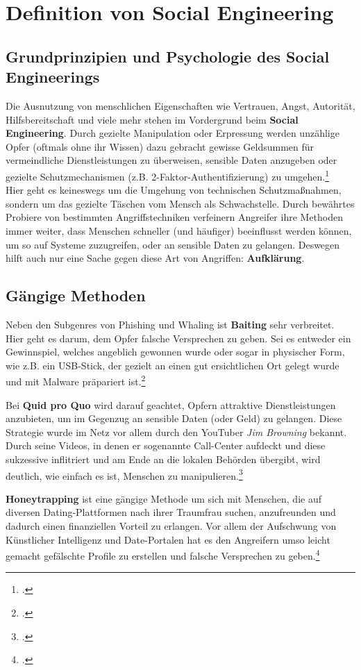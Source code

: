 \documentclass[12pt, a4paper, oneside]{scrartcl}
\begin{document}
\section{Definition von Social Engineering}

\subsection{Grundprinzipien und Psychologie des Social Engineerings}
Die Ausnutzung von menschlichen Eigenschaften wie Vertrauen, Angst, Autorität, Hilfsbereitschaft 
und viele mehr stehen im Vordergrund beim \textbf{Social Engineering}. Durch gezielte Manipulation
oder Erpressung werden unzählige Opfer (oftmals ohne ihr Wissen) dazu gebracht gewisse Geldsummen
für vermeindliche Dienstleistungen zu überweisen, sensible Daten anzugeben oder gezielte Schutzmechanismen
(z.B. 2-Faktor-Authentifizierung) zu umgehen.\footcite{BSISocialEngineering}\\
Hier geht es keineswegs um die Umgehung von technischen Schutzmaßnahmen, sondern um das gezielte
Täschen vom Mensch als Schwachstelle. Durch bewährtes Probiere von bestimmten Angriffstechniken
verfeinern Angreifer ihre Methoden immer weiter, dass Menschen schneller (und häufiger) beeinflusst
werden können, um so auf Systeme zuzugreifen, oder an sensible Daten zu gelangen.
Deswegen hilft auch nur eine Sache gegen diese Art von Angriffen: \textbf{Aufklärung}.\\

\subsection{Gängige Methoden}
Neben den Subgenres von Phishing und Whaling ist \textbf{Baiting} sehr verbreitet.
Hier geht es darum, dem Opfer falsche Versprechen zu geben. Sei es entweder ein Gewinnspiel,
welches angeblich gewonnen wurde oder sogar in physischer Form, wie z.B. ein USB-Stick,
der gezielt an einen gut ersichtlichen Ort gelegt wurde und mit Malware präpariert ist.\footcite{CS_10Arten}
\par
Bei \textbf{Quid pro Quo} wird darauf geachtet, Opfern attraktive Dienstleistungen anzubieten, um im Gegenzug
an sensible Daten (oder Geld) zu gelangen. Diese Strategie wurde im Netz vor allem durch den YouTuber \textit{Jim Browning} bekannt.
Durch seine Videos, in denen er sogenannte Call-Center aufdeckt und diese sukzessive inflitriert und
am Ende an die lokalen Behörden übergibt, wird deutlich, wie einfach es ist, Menschen zu manipulieren.\footcite{JB_YouTube}
\par
\textbf{Honeytrapping} ist eine gängige Methode um sich mit Menschen, die auf diversen Dating-Plattformen nach
ihrer Traumfrau suchen, anzufreunden und dadurch einen finanziellen Vorteil zu erlangen. Vor allem 
der Aufschwung von Künstlicher Intelligenz und Date-Portalen hat es den Angreifern umso leicht gemacht
gefälschte Profile zu erstellen und falsche Versprechen zu geben.\footcite{CS_10Arten}
\end{document}
